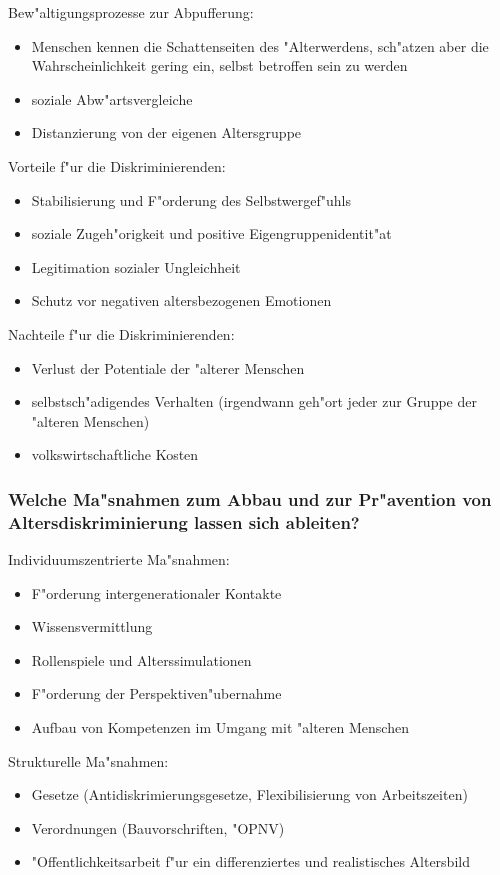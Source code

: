 \noindent Bew"altigungsprozesse zur Abpufferung:
\begin{itemize}
        \item Menschen kennen die Schattenseiten des "Alterwerdens, sch"atzen aber die Wahrscheinlichkeit gering ein, selbst betroffen sein zu werden
        \item soziale Abw"artsvergleiche
        \item Distanzierung von der eigenen Altersgruppe
\end{itemize}

\noindent Vorteile f"ur die Diskriminierenden:
\begin{itemize}
        \item Stabilisierung und F"orderung des Selbstwergef"uhls
        \item soziale Zugeh"origkeit und positive Eigengruppenidentit"at
        \item Legitimation sozialer Ungleichheit
        \item Schutz vor negativen altersbezogenen Emotionen
\end{itemize}

\noindent Nachteile f"ur die Diskriminierenden:
\begin{itemize}
        \item Verlust der Potentiale der "alterer Menschen
        \item selbstsch"adigendes Verhalten (irgendwann geh"ort jeder zur Gruppe der "alteren Menschen)
        \item volkswirtschaftliche Kosten
\end{itemize}

\subsubsection{Welche Ma"snahmen zum Abbau und zur Pr"avention von Altersdiskriminierung lassen sich ableiten?}
Individuumszentrierte Ma"snahmen:
\begin{itemize}
        \item F"orderung intergenerationaler Kontakte
        \item Wissensvermittlung
        \item Rollenspiele und Alterssimulationen
        \item F"orderung der Perspektiven"ubernahme
        \item Aufbau von Kompetenzen im Umgang mit "alteren Menschen
\end{itemize}

\noindent Strukturelle Ma"snahmen:
\begin{itemize}
        \item Gesetze (Antidiskrimierungsgesetze, Flexibilisierung von Arbeitszeiten)
        \item Verordnungen (Bauvorschriften, "OPNV)
        \item "Offentlichkeitsarbeit f"ur ein differenziertes und realistisches Altersbild
\end{itemize}
